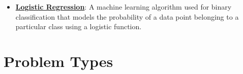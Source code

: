\documentclass{article}%
\begin{document}
\begin{itemize}[leftmargin=*]
\item \href{https://purdue.brightspace.com/d2l/common/assets/pdfjs-d2l-dist/1.0.14-legacy/web/viewer.html?file=\%2Fcontent\%2Fenforced\%2F1095467-wl.202510.CS.24300.001\%2F05L2-ML Basics.pdf\%3Fou\%3D1095467\&lang=en-us\&container=d2l-fileviewer-rendered-pdf\&fullscreen=d2l-fileviewer-rendered-pdf-dialog\&height=667#page=31}{\textbf{Logistic Regression}}: A machine learning algorithm used for binary classification that models the probability of a data point belonging to a particular class using a logistic function.%
\end{itemize}

%
\section{Problem Types}%
\label{sec:ProblemTypes}%
\end{document}
